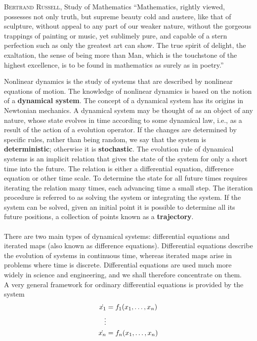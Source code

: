\begin{pquotation}{\textsc{Bertrand Russell}, Study of Mathematics}
``Mathematics, rightly viewed, possesses not only truth, but supreme beauty cold and austere, like that of sculpture, without appeal to any part of our weaker nature, without the gorgeous trappings of painting or music, yet sublimely pure, and capable of a stern perfection such as only the greatest art can show.
The true spirit of delight, the exaltation, the sense of being more than Man, which is the touchstone of the highest excellence, is to be found in mathematics as surely as in poetry.''
\end{pquotation}
Nonlinear dynamics is the study of systems that are described by nonlinear equations of motion.
The knowledge of nonlinear dynamics is based on the notion of a \textbf{dynamical system}.
The concept of a dynamical system has its origins in Newtonian mechanics.
A dynamical system may be thought of as an object of any nature, whose state evolves in time according to some dynamical law, i.e., as a result of the action of a evolution operator.
If the changes are determined by specific rules, rather than being random, we say that the system is \textbf{deterministic}; otherwise it is \textbf{stochastic}.
The evolution rule of dynamical systems is an implicit relation that gives the state of the system for only a short time into the future.
The relation is either a differential equation, difference equation or other time scale.
To determine the state for all future times requires iterating the relation many times, each advancing time a small step.
The iteration procedure is referred to as solving the system or integrating the system.
If the system can be solved, given an initial point it is possible to determine all its future positions, a collection of points known as a {\textbf{trajectory}}.\\\\
There are two main types of dynamical systems: differential equations and iterated maps (also known as difference equations).
Differential equations describe the evolution of systems in continuous time, whereas iterated maps arise in problems where time is discrete.
Differential equations are used much more widely in science and engineering, and we shall therefore concentrate on them.\\
A very general framework for ordinary differential equations is provided by the system
\begin{equation}{\label{eq:gode}}
	\begin{aligned}
		\dot{x_1}&=f_1(x_1,\ldots,x_n)\\
		\vdots& \\
		\dot{x_n}&=f_n(x_1,\ldots,x_n)
	\end{aligned}
\end{equation}
